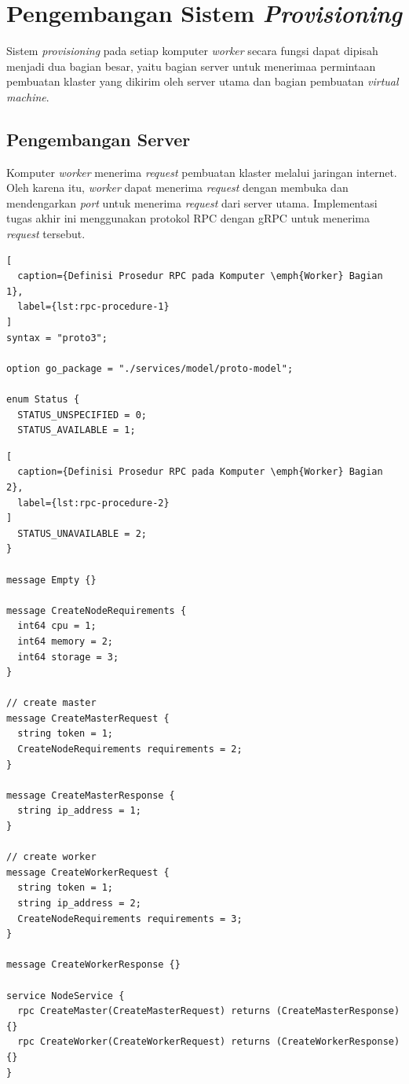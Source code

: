 \section{Pengembangan Sistem \emph{Provisioning}}
\label{sec:implementasi-sistem-provisioning}

Sistem \emph{provisioning} pada setiap komputer \emph{worker} secara fungsi dapat dipisah
menjadi dua bagian besar, yaitu bagian server untuk menerimaa permintaan pembuatan klaster yang dikirim
oleh server utama dan bagian pembuatan \emph{virtual machine}.

\subsection{Pengembangan Server}
\label{sec:server}

Komputer \emph{worker} menerima \emph{request} pembuatan klaster melalui jaringan internet.
Oleh karena itu, \emph{worker} dapat menerima \emph{request} dengan membuka dan mendengarkan \emph{port}
untuk menerima \emph{request} dari server utama. Implementasi tugas akhir ini menggunakan protokol
RPC dengan gRPC untuk menerima \emph{request} tersebut.

\begin{lstlisting}[
  caption={Definisi Prosedur RPC pada Komputer \emph{Worker} Bagian 1},
  label={lst:rpc-procedure-1}
]
syntax = "proto3";

option go_package = "./services/model/proto-model";

enum Status {
  STATUS_UNSPECIFIED = 0;
  STATUS_AVAILABLE = 1;
\end{lstlisting}

\begin{lstlisting}[
  caption={Definisi Prosedur RPC pada Komputer \emph{Worker} Bagian 2},
  label={lst:rpc-procedure-2}
]
  STATUS_UNAVAILABLE = 2;
}

message Empty {}

message CreateNodeRequirements {
  int64 cpu = 1;
  int64 memory = 2;
  int64 storage = 3;
}

// create master
message CreateMasterRequest {
  string token = 1;
  CreateNodeRequirements requirements = 2;
}

message CreateMasterResponse {
  string ip_address = 1;
}

// create worker
message CreateWorkerRequest {
  string token = 1;
  string ip_address = 2;
  CreateNodeRequirements requirements = 3;
}

message CreateWorkerResponse {}

service NodeService {
  rpc CreateMaster(CreateMasterRequest) returns (CreateMasterResponse) {}
  rpc CreateWorker(CreateWorkerRequest) returns (CreateWorkerResponse) {}
}
\end{lstlisting}

